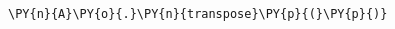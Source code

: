 {\par%
\vspace{-1\baselineskip}%
}%
\begin{notebookcell}[90]%
\begin{addmargin}[\cellleftmargin]{0em}%
{\smaller%
\par%
%
\vspace{-1\smallerfontscale}%
\begin{Verbatim}[commandchars=\\\{\}]
\PY{n}{A}\PY{o}{.}\PY{n}{transpose}\PY{p}{(}\PY{p}{)}
\end{Verbatim}
%
\par%
\vspace{-1\smallerfontscale}}%
\end{addmargin}
\end{notebookcell}

\par\vspace{1\smallerfontscale}%
    
